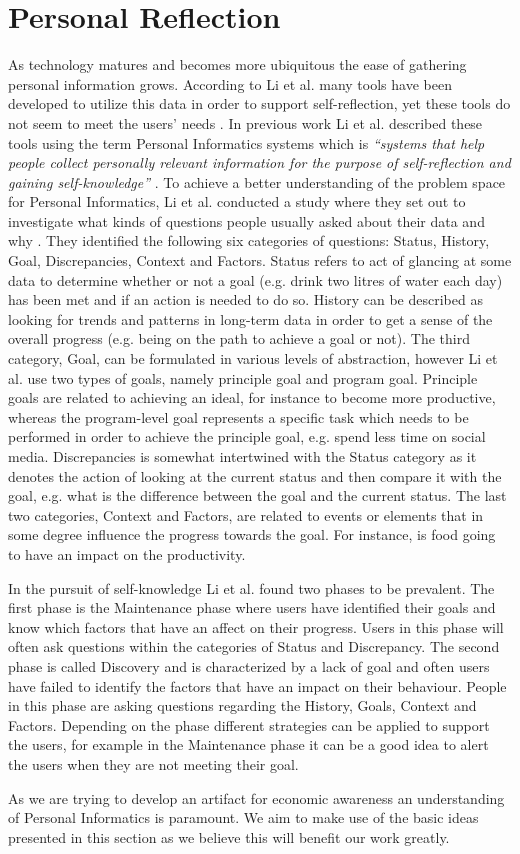 \section{Personal Reflection}
As technology matures and becomes more ubiquitous the ease of gathering personal information grows. According to Li et al. many tools have been developed to utilize this data in order to support self-reflection, yet these tools do not seem to meet the users’ needs \cite{li2011understanding}. In previous work Li et al. described these tools using the term Personal Informatics systems which is \emph{“systems that help people collect personally relevant information for the purpose of self-reflection and gaining self-knowledge”} \cite[p.~558]{li2010stage}. To achieve a better understanding of the problem space for Personal Informatics, Li et al. conducted a study where they set out to investigate what kinds of questions people usually asked about their data and why \cite{li2011understanding}. They identified the following six categories of questions: Status, History, Goal, Discrepancies, Context and Factors. Status refers to act of glancing at some data to determine whether or not a goal (e.g. drink two litres of water each day) has been met and if an action is needed to do so. History can be described as looking for trends and patterns in long-term data in order to get a sense of the overall progress (e.g. being on the path to achieve a goal or not). The third category, Goal, can be formulated in various levels of abstraction, however Li et al. use two types of goals, namely principle goal and program goal. Principle goals are related to achieving an ideal, for instance to become more productive, whereas the program-level goal represents a specific task which needs to be performed in order to achieve the principle goal, e.g. spend less time on social media. Discrepancies is somewhat intertwined with the Status category as it denotes the action of looking at the current status and then compare it with the goal, e.g. what is the difference between the goal and the current status. The last two categories, Context and Factors, are related to events or elements that in some degree influence the progress towards the goal. For instance, is food going to have an impact on the productivity.

In the pursuit of self-knowledge Li et al. found two phases to be prevalent. The first phase is the Maintenance phase where users have identified their goals and know which factors that have an affect on their progress. Users in this phase will often ask questions within the categories of Status and Discrepancy. The second phase is called Discovery and is characterized by a lack of goal and often users have failed to identify the factors that have an impact on their behaviour. People in this phase are asking questions regarding the History, Goals, Context and Factors. Depending on the phase different strategies can be applied to support the users, for example in the Maintenance phase it can be a good idea to alert the users when they are not meeting their goal.

As we are trying to develop an artifact for economic awareness an understanding of Personal Informatics is paramount. We aim to make use of the basic ideas presented in this section as we believe this will benefit our work greatly.
